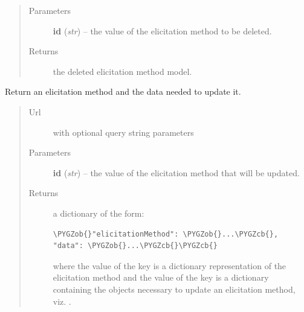 \documentclass[letterpaper,10pt,english]{sphinxmanual}
\def\PYGZob{\char`\{}
\def\PYGZcb{\char`\}}
\begin{document}
\begin{fulllineitems}
\begin{fulllineitems}
\begin{quote}
\begin{description}
\item[{Parameters}] \leavevmode
\textbf{id} (\emph{str}) -- the  value of the elicitation method to be deleted.

\item[{Returns}] \leavevmode
the deleted elicitation method model.

\end{description}\end{quote}

\end{fulllineitems}


\begin{fulllineitems}
\label{api:onlinelinguisticdatabase.controllers.elicitationmethods.ElicitationmethodsController.edit}
Return an elicitation method and the data needed to update it.
\begin{quote}\begin{description}
\item[{Url }] \leavevmode
{} with optional query string parameters

\item[{Parameters}] \leavevmode
\textbf{id} (\emph{str}) -- the  value of the elicitation method that will be updated.

\item[{Returns}] \leavevmode

a dictionary of the form:

\begin{Verbatim}[commandchars=\\\{\}]
\PYGZob{}"elicitationMethod": \PYGZob{}...\PYGZcb{}, "data": \PYGZob{}...\PYGZcb{}\PYGZcb{}
\end{Verbatim}

where the value of the  key is a dictionary
representation of the elicitation method and the value of the
 key is a dictionary containing the objects necessary to
update an elicitation method, viz. \code{\{\}}.


\end{description}\end{quote}

\end{fulllineitems}



\end{fulllineitems}
\end{document}
